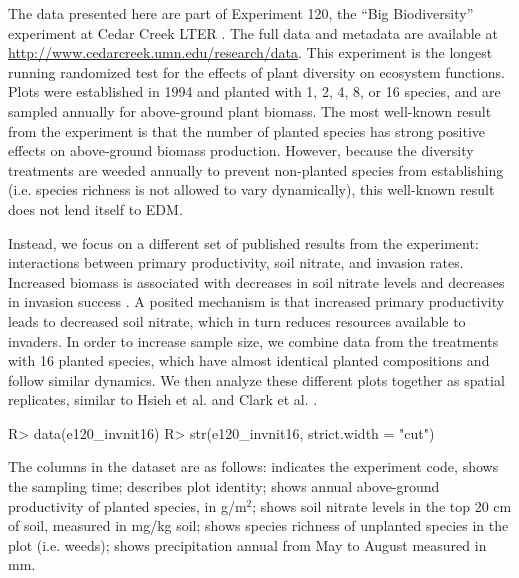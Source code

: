 \documentclass[article]{jss}
\begin{document}
The data presented here are part of Experiment 120, the ``Big Biodiversity'' experiment at Cedar Creek LTER \citep{Tilman_1997}. The full data and metadata are available at \url{http://www.cedarcreek.umn.edu/research/data}. This experiment is the longest running randomized test for the effects of plant diversity on ecosystem functions. Plots were established in 1994 and planted with 1, 2, 4, 8, or 16 species, and are sampled annually for above-ground plant biomass. The most well-known result from the experiment is that the number of planted species has strong positive effects on above-ground biomass production. However, because the diversity treatments are weeded annually to prevent non-planted species from establishing (i.e. species richness is not allowed to vary dynamically), this well-known result does not lend itself to EDM.

Instead, we focus on a different set of published results from the experiment: interactions between primary productivity, soil nitrate, and invasion rates. Increased biomass is associated with decreases in soil nitrate levels and decreases in invasion success \citep{Fargione_2005}. A posited mechanism is that increased primary productivity leads to decreased soil nitrate, which in turn reduces resources available to invaders. In order to increase sample size, we combine data from the treatments with 16 planted species, which have almost identical planted compositions and follow similar dynamics. We then analyze these different plots together as spatial replicates, similar to Hsieh et al. \cite{Hsieh_2008} and Clark et al. \cite{Clark_2015}.

\begin{Schunk}
\begin{Sinput}
R> data(e120_invnit16)
R> str(e120_invnit16, strict.width = "cut")
\end{Sinput}
\end{Schunk}

The columns in the dataset  are as follows:  indicates the experiment code,  shows the sampling time;  describes plot identity;  shows annual above-ground productivity of planted species, in g/m$^2$;  shows soil nitrate levels in the top 20 cm of soil, measured in mg/kg soil;  shows species richness of unplanted species in the plot (i.e. weeds);  shows precipitation annual from May to August measured in mm.
\end{document}
